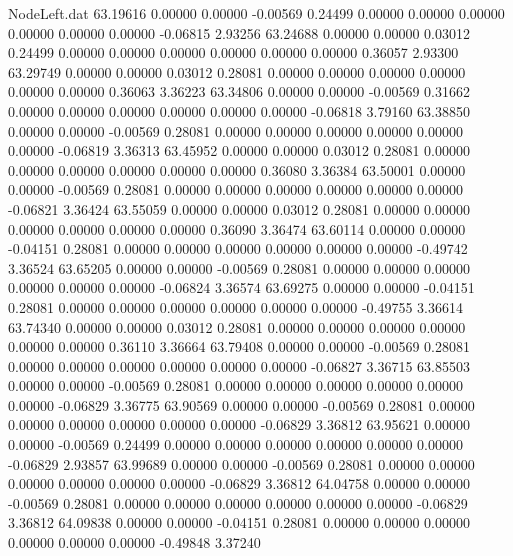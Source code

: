 \begin{filecontents}{NodeLeft.dat}
  63.19616    0.00000    0.00000    -0.00569    0.24499    0.00000    0.00000    0.00000    0.00000    0.00000    0.00000   -0.06815    2.93256
  63.24688    0.00000    0.00000     0.03012    0.24499    0.00000    0.00000    0.00000    0.00000    0.00000    0.00000    0.36057    2.93300
  63.29749    0.00000    0.00000     0.03012    0.28081    0.00000    0.00000    0.00000    0.00000    0.00000    0.00000    0.36063    3.36223
  63.34806    0.00000    0.00000    -0.00569    0.31662    0.00000    0.00000    0.00000    0.00000    0.00000    0.00000   -0.06818    3.79160
  63.38850    0.00000    0.00000    -0.00569    0.28081    0.00000    0.00000    0.00000    0.00000    0.00000    0.00000   -0.06819    3.36313
  63.45952    0.00000    0.00000     0.03012    0.28081    0.00000    0.00000    0.00000    0.00000    0.00000    0.00000    0.36080    3.36384
  63.50001    0.00000    0.00000    -0.00569    0.28081    0.00000    0.00000    0.00000    0.00000    0.00000    0.00000   -0.06821    3.36424
  63.55059    0.00000    0.00000     0.03012    0.28081    0.00000    0.00000    0.00000    0.00000    0.00000    0.00000    0.36090    3.36474
  63.60114    0.00000    0.00000    -0.04151    0.28081    0.00000    0.00000    0.00000    0.00000    0.00000    0.00000   -0.49742    3.36524
  63.65205    0.00000    0.00000    -0.00569    0.28081    0.00000    0.00000    0.00000    0.00000    0.00000    0.00000   -0.06824    3.36574
  63.69275    0.00000    0.00000    -0.04151    0.28081    0.00000    0.00000    0.00000    0.00000    0.00000    0.00000   -0.49755    3.36614
  63.74340    0.00000    0.00000     0.03012    0.28081    0.00000    0.00000    0.00000    0.00000    0.00000    0.00000    0.36110    3.36664
  63.79408    0.00000    0.00000    -0.00569    0.28081    0.00000    0.00000    0.00000    0.00000    0.00000    0.00000   -0.06827    3.36715
  63.85503    0.00000    0.00000    -0.00569    0.28081    0.00000    0.00000    0.00000    0.00000    0.00000    0.00000   -0.06829    3.36775
  63.90569    0.00000    0.00000    -0.00569    0.28081    0.00000    0.00000    0.00000    0.00000    0.00000    0.00000   -0.06829    3.36812
  63.95621    0.00000    0.00000    -0.00569    0.24499    0.00000    0.00000    0.00000    0.00000    0.00000    0.00000   -0.06829    2.93857
  63.99689    0.00000    0.00000    -0.00569    0.28081    0.00000    0.00000    0.00000    0.00000    0.00000    0.00000   -0.06829    3.36812
  64.04758    0.00000    0.00000    -0.00569    0.28081    0.00000    0.00000    0.00000    0.00000    0.00000    0.00000   -0.06829    3.36812
  64.09838    0.00000    0.00000    -0.04151    0.28081    0.00000    0.00000    0.00000    0.00000    0.00000    0.00000   -0.49848    3.37240

\end{filecontents}
